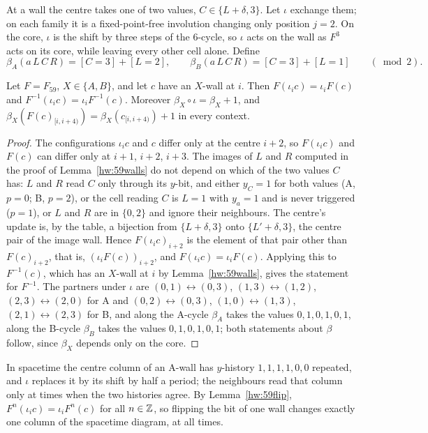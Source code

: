 At a wall the centre takes one of two values, $C\in\{L+\delta,3\}$. Let $\iota$ exchange them; on each family it is a fixed-point-free involution changing only position $j=2$. On the core, $\iota$ is the shift by three steps of the $6$-cycle, so $\iota$ acts on the wall as $F^3$ acts on its core, while leaving every other cell alone. Define
\[
\beta_A(a\,L\,C\,R)=[C=3]+[L=2],\qquad \beta_B(a\,L\,C\,R)=[C=3]+[L=1]\qquad(\bmod 2).
\]

\begin{lemma}\label{hw:59flip}
Let $F=F_{59}$, $X\in\{A,B\}$, and let $c$ have an $X$-wall at $i$. Then $F(\iota_ic)=\iota_iF(c)$ and $F^{-1}(\iota_ic)=\iota_iF^{-1}(c)$. Moreover $\beta_X\circ\iota=\beta_X+1$, and $\beta_X(F(c)_{[i,i+4)})=\beta_X(c_{[i,i+4)})+1$ in every context.
\end{lemma}

\begin{proof}
The configurations $\iota_ic$ and $c$ differ only at the centre $i+2$, so $F(\iota_ic)$ and $F(c)$ can differ only at $i+1$, $i+2$, $i+3$. The images of $L$ and $R$ computed in the proof of Lemma~\ref{hw:59walls} do not depend on which of the two values $C$ has: $L$ and $R$ read $C$ only through its $y$-bit, and either $y_C=1$ for both values (A, $p=0$; B, $p=2$), or the cell reading $C$ is $L=1$ with $y_a=1$ and is never triggered ($p=1$), or $L$ and $R$ are in $\{0,2\}$ and ignore their neighbours. The centre's update is, by the table, a bijection from $\{L+\delta,3\}$ onto $\{L'+\delta,3\}$, the centre pair of the image wall. Hence $F(\iota_ic)_{i+2}$ is the element of that pair other than $F(c)_{i+2}$, that is, $(\iota_iF(c))_{i+2}$, and $F(\iota_ic)=\iota_iF(c)$. Applying this to $F^{-1}(c)$, which has an $X$-wall at $i$ by Lemma~\ref{hw:59walls}, gives the statement for $F^{-1}$. The partners under $\iota$ are $(0,1)\leftrightarrow(0,3)$, $(1,3)\leftrightarrow(1,2)$, $(2,3)\leftrightarrow(2,0)$ for A and $(0,2)\leftrightarrow(0,3)$, $(1,0)\leftrightarrow(1,3)$, $(2,1)\leftrightarrow(2,3)$ for B, and along the A-cycle $\beta_A$ takes the values $0,1,0,1,0,1$, along the B-cycle $\beta_B$ takes the values $0,1,0,1,0,1$; both statements about $\beta$ follow, since $\beta_X$ depends only on the core.
\end{proof}

In spacetime the centre column of an A-wall has $y$-history $1,1,1,1,0,0$ repeated, and $\iota$ replaces it by its shift by half a period; the neighbours read that column only at times when the two histories agree. By Lemma~\ref{hw:59flip}, $F^n(\iota_ic)=\iota_iF^n(c)$ for all $n\in\mathbb{Z}$, so flipping the bit of one wall changes exactly one column of the spacetime diagram, at all times.

